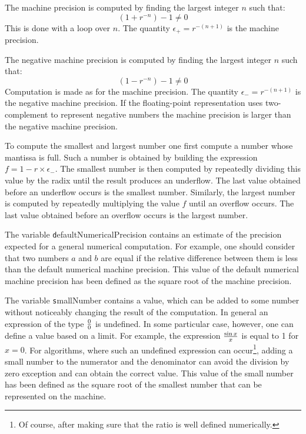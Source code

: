 The machine precision is computed by finding the largest integer
$n$ such that:
\begin{equation}
\left(1+r^{-n}\right)-1\ne 0
\end{equation}
This is done with a loop over $n$. The quantity
$\epsilon_+=r^{-\left(n+1\right)}$ is the machine precision.

The negative machine precision is computed by finding the largest
integer $n$ such that:
\begin{equation}
\left(1-r^{-n}\right)-1\ne 0
\end{equation}
Computation is made as for the machine precision. The quantity
$\epsilon_-=r^{-\left(n+1\right)}$ is the negative machine
precision. If the floating-point representation uses
two-complement to represent negative numbers the machine precision
is larger than the negative machine precision.

To compute the smallest and largest number one first compute a
number whose mantissa is full. Such a number is obtained by
building the expression $f=1-r \times \epsilon_-$. The smallest
number is then computed by repeatedly dividing this value by the
radix until the result produces an underflow. The last value
obtained before an underflow occurs is the smallest number.
Similarly, the largest number is computed by repeatedly
multiplying the value $f$ until an overflow occurs. The last value
obtained before an overflow occurs is the largest number.

The variable {\texttt defaultNumericalPrecision} contains an estimate
of the precision expected for a general numerical computation. For
example, one should consider that two numbers $a$ and $b$ are
equal if the relative difference between them is less than the
default numerical machine precision. This value of the default
numerical machine precision has been defined as the square root of
the machine precision.

The variable {\texttt smallNumber} contains a value, which can be
added to some number without noticeably changing the result of the
computation. In general an expression of the type $0 \over 0$ is
undefined. In some particular case, however, one can define a
value based on a limit. For example, the expression $\sin x \over
x $ is equal to 1 for $x=0$. For algorithms, where such an
undefined expression can occur\footnote{Of course, after making
sure that the ratio is well defined numerically.}, adding a small
number to the numerator and the denominator can avoid the division
by zero exception and can obtain the correct value. This value of
the small number has been defined as the square root of the
smallest number that can be represented on the machine.

